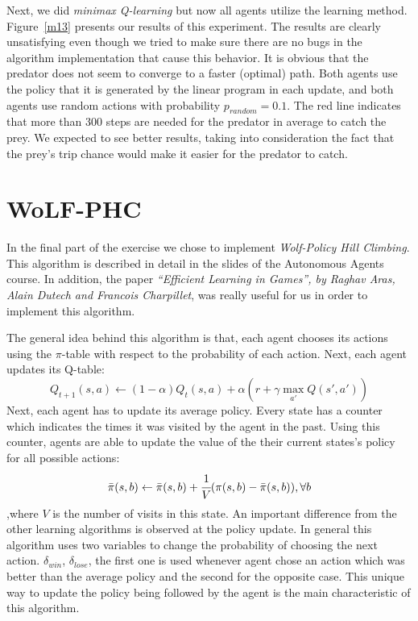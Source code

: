 \documentclass[a4paper,11pt]{article}
\begin{document}
Next, we did \textit{minimax Q-learning} but now all agents utilize the learning method. Figure~\ref{m13}  presents our results of this experiment. The results are clearly unsatisfying even though we tried to make sure there are no bugs in the algorithm implementation that cause this behavior. It is obvious that the predator does not seem to converge to a faster (optimal) path. Both agents use the policy that it is generated by the linear program in each update, and both agents use random actions with probability $p_{random} = 0.1$. The red line indicates that more than 300 steps are needed for the predator in average to catch the prey. %
We expected to see better results, taking into consideration the fact that the prey's trip chance would make it easier for the predator to catch.


\section{WoLF-PHC}
In the final part of the exercise we chose to implement \textit{Wolf-Policy Hill Climbing}. This algorithm is described in detail in the slides of the Autonomous Agents course. In addition, the paper \textit{``Efficient Learning in Games'', by Raghav Aras, Alain Dutech and Francois Charpillet}, was really useful for us in order to implement this algorithm.

The general idea behind this algorithm is that, each agent chooses its actions using the $\pi$-table with respect to the probability of each action. Next, each agent updates its Q-table:
\[
Q_{t+1}(s,a) \leftarrow (1-\alpha)Q_{t}(s,a)+\alpha(r + \gamma \max_{a'}Q(s',a'))
\]
Next, each agent has to update its average policy. Every state has a counter which indicates the times it was visited by the agent in the past. Using this counter, agents are able to update the value of the their current states's policy for all possible actions:
\[
\bar{\pi}(s,b) \leftarrow \bar{\pi}(s,b) + \cfrac{1}{V} (\pi(s,b) - \bar{\pi}(s,b)), \forall b
\]
,where $V$ is the number of visits in this state. An important difference from the other learning algorithms is observed at the policy update. In general this algorithm uses two variables to change the probability of choosing the next action. $\delta_{win}$, $\delta_{lose}$, the first one is used whenever agent chose an action which was better than the average policy and the second for the opposite case. This unique way to update the policy being followed by the agent is the main characteristic of this algorithm.
\end{document}

